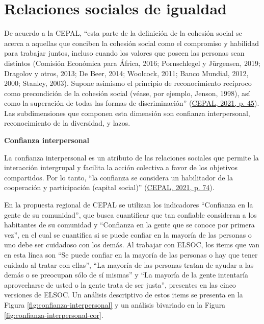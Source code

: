 \documentclass[
  12pt,
]{book}
\begin{document}
\hypertarget{relaciones-sociales-de-igualdad}{%
\section{Relaciones sociales de igualdad}\label{relaciones-sociales-de-igualdad}}

De acuerdo a la CEPAL, ``esta parte de la definición de la cohesión social se acerca a aquellas que conciben la cohesión social como el compromiso y habilidad para trabajar juntos, incluso cuando los valores que poseen las personas sean distintos (Comisión Económica para África, 2016; Pornschlegel y Jürgensen, 2019; Dragolov y otros, 2013; De Beer, 2014; Woolcock, 2011; Banco Mundial, 2012, 2000; Stanley, 2003). Supone asimismo el principio de reconocimiento recíproco como precondición de la cohesión social (véase, por ejemplo, Jenson, 1998), así como la superación de todas las formas de discriminación'' (\protect\hyperlink{ref-cepal_cohesion_2021}{CEPAL, 2021, p. 45}). Las subdimensiones que componen esta dimensión son confianza interpersonal, reconocimiento de la diversidad, y lazos.

\textbf{Confianza interpersonal}

La confianza interpersonal es un atributo de las relaciones sociales que permite la interacción intergrupal y facilita la acción colectiva a favor de los objetivos compartidos. Por lo tanto, ``la confianza se considera un habilitador de la cooperación y participación (capital social)'' (\protect\hyperlink{ref-cepal_cohesion_2021}{CEPAL, 2021, p. 74}).

En la propuesta regional de CEPAL se utilizan los indicadores ``Confianza en la gente de su comunidad'', que busca cuantificar que tan confiable consideran a los habitantes de su comunidad y ``Confianza en la gente que se conoce por primera vez'', en el cual se cuantifica si se puede confiar en la mayoría de las personas o uno debe ser cuidadoso con los demás. Al trabajar con ELSOC, los items que van en esta línea son ``Se puede confiar en la mayoría de las personas o hay que tener cuidado al tratar con ellas'', ``La mayoría de las personas tratan de ayudar a las demás o se preocupan sólo de sí mismas'' y ``La mayoría de la gente intentaría aprovecharse de usted o la gente trata de ser justa'', presentes en las cinco versiones de ELSOC. Un análisis descriptivo de estos items se presenta en la Figura \ref{fig:confianza-interpersonal} y un análisis bivariado en la Figura \ref{fig:confianza-interpersonal-cor}.
\end{document}

